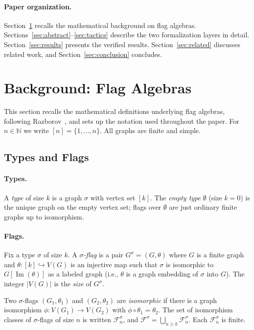 \documentclass{article}
\begin{document}
\paragraph{Paper organization.}
Section~\ref{sec:background} recalls the mathematical background on flag
algebras.  Sections~\ref{sec:abstract}--\ref{sec:tactics} describe the two
formalization layers in detail.  Section~\ref{sec:results} presents the
verified results.  Section~\ref{sec:related} discusses related work, and
Section~\ref{sec:conclusion} concludes.


\section{Background: Flag Algebras}
\label{sec:background}

This section recalls the mathematical definitions underlying flag algebras,
following Razborov~\cite{razborov2007flag}, and sets up the notation used
throughout the paper.
For $n \in \mathbb{N}$ we write $[n] = \{1,\ldots,n\}$.
All graphs are finite and simple.

\subsection{Types and Flags}

\paragraph{Types.}
A \emph{type} of size $k$ is a graph $\sigma$ with vertex set $[k]$.
The \emph{empty type} $\emptyset$ (size $k=0$) is the unique graph on the
empty vertex set; flags over $\emptyset$ are just ordinary finite graphs
up to isomorphism.

\paragraph{Flags.}
Fix a type $\sigma$ of size $k$.
A \emph{$\sigma$-flag} is a pair $G^\sigma = (G, \theta)$ where $G$ is a
finite graph and $\theta : [k] \hookrightarrow V(G)$ is an injective map such
that $\sigma$ is isomorphic to $G[\operatorname{Im}(\theta)]$ as a labeled
graph (i.e., $\theta$ is a graph embedding of $\sigma$ into $G$).
The integer $|V(G)|$ is the \emph{size} of $G^\sigma$.

Two $\sigma$-flags $(G_1,\theta_1)$ and $(G_2,\theta_2)$ are
\emph{isomorphic} if there is a graph isomorphism $\phi: V(G_1)\to V(G_2)$
with $\phi \circ \theta_1 = \theta_2$.  The set of isomorphism classes of
$\sigma$-flags of size $n$ is written $\mathcal{F}^\sigma_n$, and
$\mathcal{F}^\sigma = \bigcup_{n \geq k} \mathcal{F}^\sigma_n$.
Each $\mathcal{F}^\sigma_n$ is finite.
\end{document}
